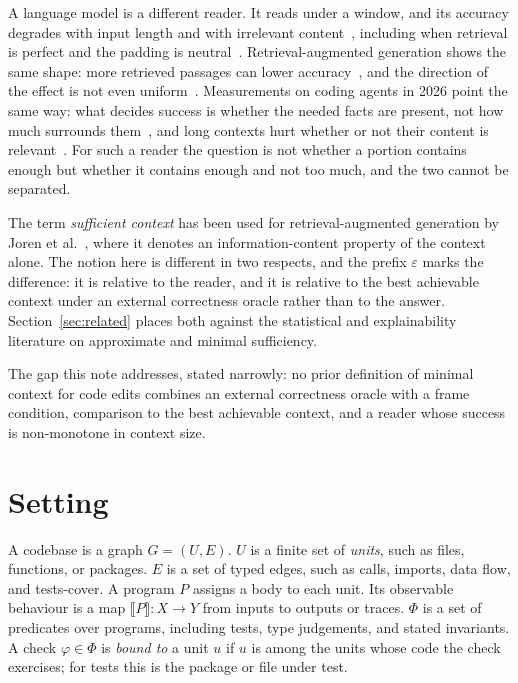 \documentclass[10pt]{article}
\theoremstyle{definition}
\theoremstyle{plain}
\theoremstyle{remark}
\newcommand{\sem}[1]{\llbracket #1 \rrbracket}
\newcommand{\eps}{\varepsilon}
\begin{document}
A language model is a different reader. It reads under a window, and its accuracy degrades with input length and with irrelevant content~\cite{liu2024lost,levy2024same,hsieh2024ruler,shi2023distracted}, including when retrieval is perfect and the padding is neutral~\cite{du2025length}. Retrieval-augmented generation shows the same shape: more retrieved passages can lower accuracy~\cite{jin2024longcontext,yoran2023robust}, and the direction of the effect is not even uniform~\cite{cuconasu2024noise}. Measurements on coding agents in 2026 point the same way: what decides success is whether the needed facts are present, not how much surrounds them~\cite{sambodden2026context,mohammadi2026workingset}, and long contexts hurt whether or not their content is relevant~\cite{xue2026contextrot}. For such a reader the question is not whether a portion contains enough but whether it contains enough and not too much, and the two cannot be separated.

The term \emph{sufficient context} has been used for retrieval-augmented generation by Joren et al.~\cite{joren2024sufficient}, where it denotes an information-content property of the context alone. The notion here is different in two respects, and the prefix $\eps$ marks the difference: it is relative to the reader, and it is relative to the best achievable context under an external correctness oracle rather than to the answer. Section~\ref{sec:related} places both against the statistical and explainability literature on approximate and minimal sufficiency.

The gap this note addresses, stated narrowly: no prior definition of minimal context for code edits combines an external correctness oracle with a frame condition, comparison to the best achievable context, and a reader whose success is non-monotone in context size.

\section{Setting}

A codebase is a graph $G=(U,E)$. $U$ is a finite set of \emph{units}, such as files, functions, or packages. $E$ is a set of typed edges, such as calls, imports, data flow, and tests-cover. A program $P$ assigns a body to each unit. Its observable behaviour is a map $\sem{P} : X \to Y$ from inputs to outputs or traces. $\Phi$ is a set of predicates over programs, including tests, type judgements, and stated invariants. A check $\varphi \in \Phi$ is \emph{bound to} a unit $u$ if $u$ is among the units whose code the check exercises; for tests this is the package or file under test.
\end{document}
